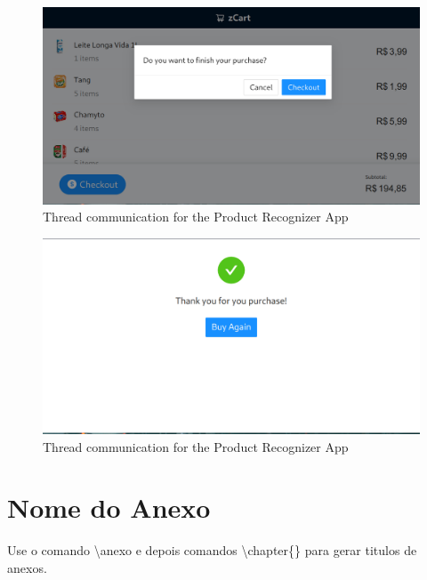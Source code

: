 \documentclass[openright]{normas-utf-tex} %
\begin{document}
\begin{figure}[H]
	\centering
	\includegraphics[width=1\textwidth]{./images/userapp4.png}
	\caption[]{Thread communication for the Product Recognizer App}
\end{figure}

\begin{figure}[H]
	\centering
	\includegraphics[width=1\textwidth]{./images/userapp5.png}
	\caption[]{Thread communication for the Product Recognizer App}
\end{figure}

\anexo
\chapter{Nome do Anexo}

Use o comando {\ttfamily \textbackslash anexo} e depois comandos {\ttfamily \textbackslash chapter\{\}}
para gerar titulos de anexos.
\end{document}

